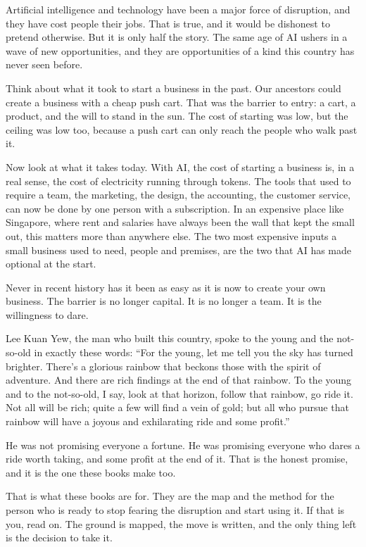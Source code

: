 \documentclass[10pt,twoside,openany]{memoir}
\begin{document}
Artificial intelligence and technology have been a major force of
disruption, and they have cost people their jobs. That is true, and it
would be dishonest to pretend otherwise. But it is only half the story.
The same age of AI ushers in a wave of new opportunities, and they are
opportunities of a kind this country has never seen before.

Think about what it took to start a business in the past. Our ancestors
could create a business with a cheap push cart. That was the barrier to
entry: a cart, a product, and the will to stand in the sun. The cost of
starting was low, but the ceiling was low too, because a push cart can
only reach the people who walk past it.

Now look at what it takes today. With AI, the cost of starting a
business is, in a real sense, the cost of electricity running through
tokens. The tools that used to require a team, the marketing, the
design, the accounting, the customer service, can now be done by one
person with a subscription. In an expensive place like Singapore, where
rent and salaries have always been the wall that kept the small out,
this matters more than anywhere else. The two most expensive inputs a
small business used to need, people and premises, are the two that AI
has made optional at the start.

Never in recent history has it been as easy as it is now to create your
own business. The barrier is no longer capital. It is no longer a team.
It is the willingness to dare.

Lee Kuan Yew, the man who built this country, spoke to the young and the
not-so-old in exactly these words: ``For the young, let me tell you the
sky has turned brighter. There's a glorious rainbow that beckons those
with the spirit of adventure. And there are rich findings at the end of
that rainbow. To the young and to the not-so-old, I say, look at that
horizon, follow that rainbow, go ride it. Not all will be rich; quite a
few will find a vein of gold; but all who pursue that rainbow will have
a joyous and exhilarating ride and some profit.''

He was not promising everyone a fortune. He was promising everyone who
dares a ride worth taking, and some profit at the end of it. That is the
honest promise, and it is the one these books make too.

That is what these books are for. They are the map and the method for
the person who is ready to stop fearing the disruption and start using
it. If that is you, read on. The ground is mapped, the move is written,
and the only thing left is the decision to take it.
\end{document}
